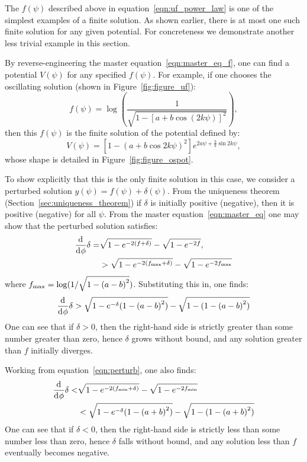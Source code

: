 %
The $f(\psi)$ described above in equation~\eqref{eqn:uf_power_law} is one of the simplest examples of a finite solution. As shown earlier, there is at most one such finite solution for any given potential. For concreteness we demonstrate another less trivial example in this section.

By reverse-engineering the master equation~\eqref{eqn:master_eq_f}, one can find a potential $V(\psi)$ for any specified $f(\psi)$. For example, if one chooses the oscillating solution (shown in Figure~\ref{fig:figure_uf}):
%
\begin{equation}
  f(\psi) = \log\left( \frac{1}{\sqrt{1-{[a+b\cos(2k\psi)]}^2}}\right),
  \label{eqn:uf_example}
\end{equation}
%
then this $f(\psi)$ is the finite solution of the potential defined by:
%
\begin{equation}
	V(\psi)
    =
    \left[ 1-{(a+b \cos2k\psi)}^2 \right]
    e^{2 a \psi +\frac{b}{k} \sin 2k\psi},
    \label{eqn:Vphi_uf_example}
\end{equation}
whose shape is detailed in Figure~\ref{fig:figure_ospot}.
%

To show explicitly that this is the only finite solution in this case, we consider a perturbed solution $y(\psi) = f(\psi)+\delta(\psi)$.  From the uniqueness theorem (Section~\ref{sec:uniqueness_theorem}) if $\delta$ is initially positive (negative), then it is positive (negative) for all $\psi$. From the master equation~\eqref{eqn:master_eq} one may show that the perturbed solution satisfies:
%
\begin{align}
  \frac{\operatorname{d}^{}\!{}}{\operatorname{d}^{}\!{\phi}}\delta 
  =& 
  \sqrt{1-e^{-2(f+\delta)}} -\sqrt{1-e^{-2f}}, 
  \label{eqn:perturb}
  \\
  &>
  \sqrt{1-e^{-2(f_\mathrm{max}+\delta)}} -\sqrt{1-e^{-2f_\mathrm{max}}}
\end{align}
%
where $f_\mathrm{max} = \log(1/\sqrt{1-{(a-b)}^2})$. Substituting this in, one finds:
%
\begin{align}
  \frac{\operatorname{d}^{}\!{}}{\operatorname{d}^{}\!{\phi}}\delta 
  > 
  \sqrt{1-e^{-\delta}({1-{(a-b)}^2})} - \sqrt{1-({1-{(a-b)}^2})}
\end{align}
%
One can see that if $\delta>0$, then the right-hand side is strictly greater than some number greater than zero, hence $\delta$ grows without bound, and any solution greater than $f$ initially diverges. 

Working from equation~\eqref{eqn:perturb}, one also finds:
%
\begin{align}
  \frac{\operatorname{d}^{}\!{}}{\operatorname{d}^{}\!{\phi}}\delta 
  <&
  \sqrt{1-e^{-2(f_\mathrm{min}+\delta)}} -\sqrt{1-e^{-2f_\mathrm{min}}} 
  \nonumber
  \\
  &<
  \sqrt{1-e^{-\delta}({1-{(a+b)}^2})} - \sqrt{1-({1-{(a+b)}^2})}
\end{align}
%
One can see that if $\delta<0$, then the right-hand side is strictly less than some number less than zero, hence $\delta$ falls without bound, and any solution less than $f$ eventually becomes negative. 


